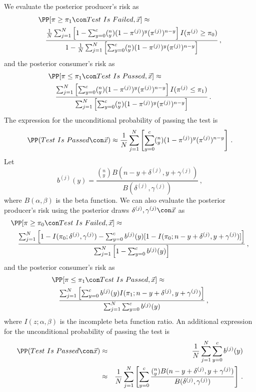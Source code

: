 \documentclass {book}
\begin{document}
We evaluate the posterior producer's risk as
\begin{eqnarray*}
\lefteqn{\PP[\pi \geq \pi_{1}\con Test\mbox{ }Is\mbox{ }Failed,
\vec{x} ] \approx} \\
 & & \frac{\frac{1}{N} \sum^{N}_{j=1} \left[1-
\sum^{c}_{y=0}(_y^{n})(1-\pi^{(j)})^{y}(\pi^{(j)})^{n-y} \right]
I(\pi^{(j)} \geq \pi_0)}{1- \frac{1}{N}
\sum^{N}_{j=1}\left[\sum^{c}_{y=0}(_y^{n})(1-\pi^{(j)})^{y}(\pi^{(j)})^{n-y}
\right]} \, ,
\end{eqnarray*}
and the posterior consumer's risk as
\begin{eqnarray*}
\lefteqn{\PP[\pi \leq \pi_{1} \con Test\mbox{ }Is\mbox{ }Passed, \vec{x} ] \approx} \\
& & \frac{\sum^{N}_{j=1} \left[
\sum^{c}_{y=0}(_y^{n})(1-\pi^{(j)})^{y}(\pi^{(j)})^{n-y} \right]
I(\pi^{(j)} \leq \pi_1)}{\sum^{N}_{j=1}\left[
\sum^{c}_{y=0}(_y^{n})(1-\pi^{(j)})^{y}(\pi^{(j)})^{n-y} \right]}
\, .
\end{eqnarray*}
The expression for the unconditional probability of passing the
test is
\begin{equation}\label{ch10:eqn9a}
\PP(Test\mbox{ }Is\mbox{ }Passed \con \vec{x} ) \approx \frac
{1}{N}\sum^{N}_{j=1}\left[
\sum^{c}_{y=0}(_y^{n})(1-\pi^{(j)})^{y}(\pi^{(j)})^{n-y} \right]
\, .
\end{equation}
Let
\begin{displaymath}
b^{(j)}(y) = \frac{(_y^{n})B(n-y+\delta^{(j)},y+\gamma^{(j)})}
{B(\delta^{(j)},\gamma^{(j)})} \, ,
\end{displaymath}
where $B(\alpha, \beta)$ is the beta function. We can also
evaluate the posterior producer's risk using the posterior draws
$\delta^{(j)}, \gamma^{(j)} \con \vec{x}$ as
\begin{eqnarray*}
\lefteqn{\PP[\pi \geq \pi_{0}\con Test\mbox{ }Is\mbox{ }Failed,
\vec{x} ] \approx} \\
 & & \frac
{\sum^{N}_{j=1} \left[
1-I(\pi_{0};\delta^{(j)},\gamma^{(j)})-\sum^{c}_{y=0}
b^{(j)}(y)[1-I(\pi_{0};n-y+\delta^{(j)}, y+\gamma^{(j)})] \right]}
{\sum^{N}_{j=1} \left[1-\sum^{c}_{y=0} b^{(j)}(y) \right]} \, ,
\end{eqnarray*}
and the posterior consumer's risk as
\begin{eqnarray*}
\lefteqn{\PP[\pi \leq \pi_{1} \con Test\mbox{ }Is\mbox{ }Passed, \vec{x} ] \approx} \\
& & \frac {\sum^{N}_{j=1} \left[\sum^{c}_{y=0} b^{(j)}(y)
I(\pi_{1};n-y+\delta^{(j)},y+\gamma^{(j)})\right]}{\sum^{N}_{j=1}
\sum^{c}_{y=0} b^{(j)}(y)} \, ,
\end{eqnarray*}
where $I(z; \alpha, \beta)$ is the incomplete beta function ratio.
An additional expression for the unconditional probability of
passing the test is
\begin{eqnarray*}
\PP(Test\mbox{ }Is\mbox{ }Passed \con \vec{x} ) & \approx &
\frac{1}{N}\sum^{N}_{j=1} \sum^{c}_{y=0} b^{(j)}(y)\\
\mbox{} & \approx & \frac
{1}{N}\sum^{N}_{j=1}\left[\sum^{c}_{y=0}\frac{(_y^{n})B(n-y+\delta^{(j)},y+\gamma^{(j)})}
{B(\delta^{(j)},\gamma^{(j)})}\right] \, .
\end{eqnarray*}
\end{document}
